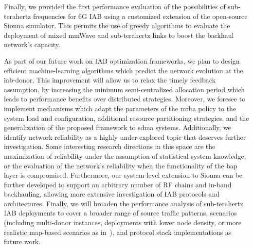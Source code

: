 Finally, we provided the first performance evaluation of the possibilities of sub-terahertz frequencies for 6G IAB using a customized extension of the open-source Sionna simulator. This permits the use of greedy algorithms to evaluate the deployment of mixed mmWave and sub-terahertz links to boost the backhaul network's capacity.


As part of our future work on IAB optimization frameworks, we plan to design efficient machine-learning algorithms which predict the network evolution at the \gls{iab}-donor. This improvement will allow us to relax the timely feedback assumption, by increasing the minimum semi-centralized allocation period which leads to performance benefits over distributed strategies. Moreover, we foresee to implement mechanisms which adapt the parameters of the \gls{mrba} policy to the system load and configuration, additional resource partitioning strategies, and the generalization of the proposed framework to \gls{sdma} systems. 
Additionally, we identify network reliability as a highly under-explored topic that deserves further investigation. Some interesting research directions in this space are the maximization of reliability under the assumption of statistical system knowledge, or the evaluation of the network's reliability when the functionality of the \gls{bap} layer is compromised. Furthermore, our system-level extension to Sionna can be further developed to support an arbitrary number of RF chains and in-band backhauling, allowing more extensive investigation of IAB protocols and architectures.
Finally, we will broaden the performance analysis of sub-terahertz IAB deployments to cover a broader range of source traffic patterns, scenarios (including multi-donor instances, deployments with lower node density, or more realistic map-based scenarios as in~\cite{gemmi2023on,gemmi2022on}), and protocol stack implementations as future work.